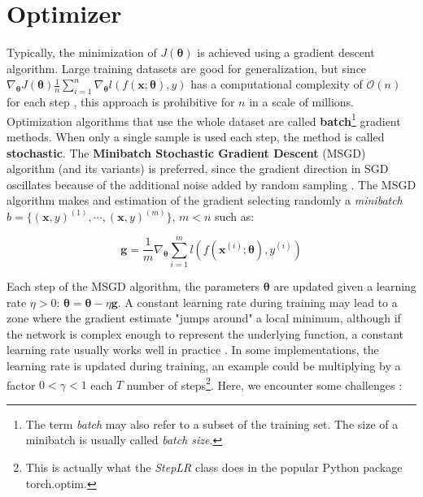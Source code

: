 \section{Optimizer}
\label{sec:optimizer}
Typically, the minimization of $J(\boldsymbol{\theta})$ is achieved using a gradient descent algorithm. Large training datasets are good for generalization, but since $\nabla_{\boldsymbol{\theta}} J (\boldsymbol{\theta}) \frac{1}{n}\sum_{i=1}^n \nabla_{\boldsymbol{\theta}} l(f(\mathbf{x}; \boldsymbol{\theta}), y)$ has a computational complexity of $\mathcal{O}(n)$ for each step \cite{goodfellow2016}, this approach is prohibitive for $n$ in a scale of millions. Optimization algorithms that use the whole dataset are called \textbf{batch}\footnote{The term \textit{batch} may also refer to a subset of the training set. The size of a minibatch is usually called \textit{batch size}.} gradient methods.
When only a single sample is used each step, the method is called \textbf{stochastic}. The \textbf{Minibatch Stochastic Gradient Descent} (MSGD) algorithm (and its variants) is preferred, since the gradient direction in SGD oscillates because of the additional noise added by random sampling \cite{sun2019}.
The MSGD algorithm makes and estimation of the gradient selecting randomly a \textit{minibatch} $b = \{(\mathbf{x}, y)^{(1)},\cdots, (\mathbf{x}, y)^{(m)}\}$, $m<n$ such as:

\begin{equation}
    \label{eqn:gradient_estimate}
    \mathbf{g} = \frac{1}{m} \nabla_{\boldsymbol{\theta}} \sum_{i=1}^m l(f(\mathbf{x}^{(i)}; \boldsymbol{\theta}), y^{(i)})
\end{equation}

Each step of the MSGD algorithm, the parameters $\boldsymbol{\theta}$ are updated given a learning rate $\eta > 0$: $\boldsymbol{\theta} = \boldsymbol{\theta} - \eta \mathbf{g}$. A constant learning rate during training may lead to a zone where the gradient estimate "jumps around" a local minimum, although if the network is complex enough to represent the underlying function, a constant learning rate usually works well in practice \cite{sun2019a}. In some implementations, the learning rate is updated during training, an example could be multiplying by a factor $0<\gamma<1$ each $T$ number of steps\footnote{This is actually what the \textit{StepLR} class does in the popular Python package torch.optim.}.
Here, we encounter some challenges \cite{ruder2017}:


